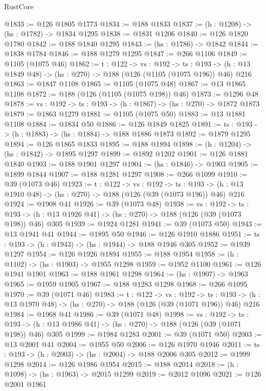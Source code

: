 \begin{lexlean}{RustCore}
\begin{coremodule}
@1833 := @126 @1805 @1773
@1834 := @188 @1833
@1837 := (h : @1208) -> (hs : @1782) -> @1834 @1295
@1838 := @1831 @1206
@1840 := @126 @1820 @1780
@1842 := @188 @1840 @1295
@1843 := (hs : @1786) -> @1842
@1844 := @1838 @1784
@1846 := @188 @1279 @1295
@1847 := @266 @1106
@1849 := @1105 (@1075 @46)
@1862 := {t : @122} ->
  {vs : @192} ->
  {ts : @193} -> (h : @13 @1849 @48) -> (hs : @270) -> @188 (@126 (@1105 (@1075 @196)) @46) @216
@1863 := @1847 @1108
@1865 := @1105 (@1075 @48)
@1867 := @13 @1865 @1108
@1872 := @188 (@126 (@1105 (@1075 @198)) @46)
@1873 := @1296 @48
@1878 := {vs : @192} -> {ts : @193} -> (h : @1867) -> (hs : @270) -> @1872 @1873
@1879 := @1863 @1279
@1881 := @1105 (@1075 @50)
@1883 := @13 @1881 @1108
@1884 := @1834 @50
@1886 := @126 @1849 @1825
@1891 := {ts : @193} -> (h : @1883) -> (hs : @1884) -> @188 @1886 @1873
@1892 := @1879 @1295
@1894 := @126 @1865 @1833
@1895 := @188 @1894
@1898 := (h : @1204) -> (hs : @1842) -> @1895 @1297
@1899 := @1892 @1202
@1901 := @126 @1881 @1840
@1903 := @188 @1901 @1297
@1904 := (hs : @1846) -> @1903
@1905 := @1899 @1844
@1907 := @188 @1281 @1297
@1908 := @266 @1099
@1910 := @39 (@1073 @46)
@1923 := {t : @122} ->
  {vs : @192} ->
  {ts : @193} -> (h : @13 @1910 @48) -> (hs : @270) -> @188 (@126 (@39 (@1073 @196)) @46) @216
@1924 := @1908 @41
@1926 := @39 (@1073 @48)
@1938 := {vs : @192} ->
  {ts : @193} -> (h : @13 @1926 @41) -> (hs : @270) -> @188 (@126 (@39 (@1073 @198)) @46) @305
@1939 := @1924 @1281
@1941 := @39 (@1073 @50)
@1943 := @13 @1941 @41
@1944 := @1895 @50
@1946 := @126 @1910 @1886
@1951 := {ts : @193} -> (h : @1943) -> (hs : @1944) -> @188 @1946 @305
@1952 := @1939 @1297
@1954 := @126 @1926 @1894
@1955 := @188 @1954
@1958 := (h : @1102) -> (hs : @1903) -> @1955 @1298
@1959 := @1952 @1100
@1961 := @126 @1941 @1901
@1963 := @188 @1961 @1298
@1964 := (hs : @1907) -> @1963
@1965 := @1959 @1905
@1967 := @188 @1283 @1298
@1968 := @266 @1095
@1970 := @39 (@1071 @46)
@1983 := {t : @122} ->
  {vs : @192} ->
  {ts : @193} -> (h : @13 @1970 @48) -> (hs : @270) -> @188 (@126 (@39 (@1071 @196)) @46) @216
@1984 := @1968 @41
@1986 := @39 (@1071 @48)
@1998 := {vs : @192} ->
  {ts : @193} -> (h : @13 @1986 @41) -> (hs : @270) -> @188 (@126 (@39 (@1071 @198)) @46) @305
@1999 := @1984 @1283
@2001 := @39 (@1071 @50)
@2003 := @13 @2001 @41
@2004 := @1955 @50
@2006 := @126 @1970 @1946
@2011 := {ts : @193} -> (h : @2003) -> (hs : @2004) -> @188 @2006 @305
@2012 := @1999 @1298
@2014 := @126 @1986 @1954
@2015 := @188 @2014
@2018 := (h : @1098) -> (hs : @1963) -> @2015 @1299
@2019 := @2012 @1096
@2021 := @126 @2001 @1961

\end{coremodule}
\end{lexlean}
